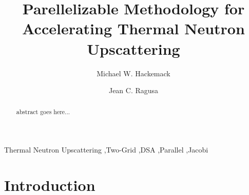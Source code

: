 \documentclass[preprint,10pt]{elsarticle}
\begin{document}
\begin{frontmatter}
\title{Parellelizable Methodology for Accelerating Thermal Neutron Upscattering}
\author{Michael W. Hackemack}
\author{Jean C. Ragusa}
\address{Department of Nuclear Engineering, Texas A\&M University, College Station, TX 77843, USA}
\begin{abstract}
abstract goes here...
\end{abstract}
\begin{keyword}
Thermal Neutron Upscattering \sep Two-Grid \sep DSA \sep Parallel \sep Jacobi
\end{keyword}
\end{frontmatter}

\linenumbers

\section{Introduction} \label{sec::intro}
\end{document}
